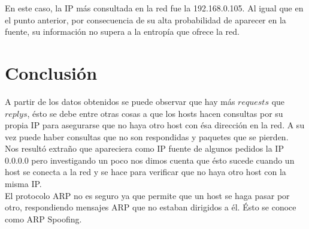 \documentclass{article}
\begin{document}
En este caso, la IP más consultada en la red fue la 192.168.0.105. Al igual
que en el punto anterior, por consecuencia de su alta probabilidad de aparecer
en la fuente, su información no supera a la entropía que ofrece la red.

\section{Conclusión}
A partir de los datos obtenidos se puede observar que hay más $requests$ que
$replys$, ésto se debe entre otras cosas a que los hosts hacen consultas por
su propia IP para asegurarse que no haya otro host con ésa dirección en la
red. A su vez puede haber consultas que no son respondidas y paquetes que se
pierden.\\ Nos resultó extraño que apareciera como IP fuente de algunos
pedidos la IP 0.0.0.0 pero investigando un poco nos dimos cuenta que ésto
sucede cuando un host se conecta a la red y se hace para verificar que no haya
otro host con la misma IP.\\ El protocolo ARP no es seguro ya que permite que
un host se haga pasar por otro, respondiendo mensajes ARP que no estaban
dirigidos a él. Ésto se conoce como ARP Spoofing.
\end{document}
